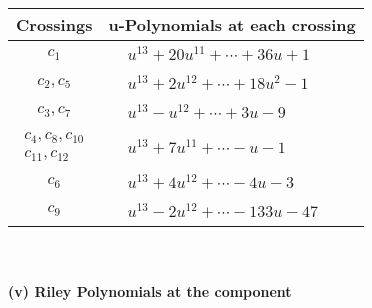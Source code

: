 \documentclass[1p]{elsarticle_modified}
\theoremstyle{definition}
\begin{document}
\begin{tabular}{m{50pt}|m{274pt}}
Crossings & \hspace{64pt}u-Polynomials at each crossing \\
\hline $$\begin{aligned}c_{1}\end{aligned}$$&$\begin{aligned}
&u^{13}+20 u^{11}+\cdots+36 u+1
\end{aligned}$\\
\hline $$\begin{aligned}c_{2},c_{5}\end{aligned}$$&$\begin{aligned}
&u^{13}+2 u^{12}+\cdots+18 u^2-1
\end{aligned}$\\
\hline $$\begin{aligned}c_{3},c_{7}\end{aligned}$$&$\begin{aligned}
&u^{13}- u^{12}+\cdots+3 u-9
\end{aligned}$\\
\hline $$\begin{aligned}c_{4},c_{8},c_{10}\\c_{11},c_{12}\end{aligned}$$&$\begin{aligned}
&u^{13}+7 u^{11}+\cdots- u-1
\end{aligned}$\\
\hline $$\begin{aligned}c_{6}\end{aligned}$$&$\begin{aligned}
&u^{13}+4 u^{12}+\cdots-4 u-3
\end{aligned}$\\
\hline $$\begin{aligned}c_{9}\end{aligned}$$&$\begin{aligned}
&u^{13}-2 u^{12}+\cdots-133 u-47
\end{aligned}$\\
\hline
\end{tabular}\\~\\
\newpage\renewcommand{\arraystretch}{1}
\flushleft \textbf{(v) Riley Polynomials at the component}\newline \\
\end{document}
